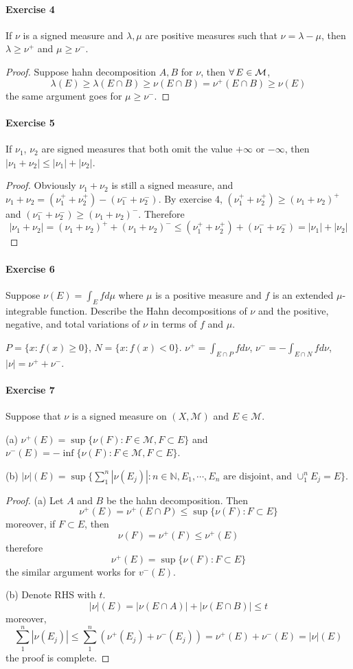 \paragraph*{Exercise 4}
If $\nu$ is a signed measure and $\lambda,\mu$ are positive measures such that $\nu=\lambda-\mu$, then $\lambda\ge\nu^+$ and $\mu\ge\nu^-$.
\begin{proof}
    Suppose hahn decomposition $A,B$ for $\nu$, then $\forall\, E\in\mathcal{M}$,
    $$
    \lambda(E)\ge\lambda(E\cap B)\ge\nu(E\cap B)=\nu^+(E\cap B)\ge\nu(E)
    $$
    the same argument goes for $\mu\ge\nu^-$.
\end{proof}
\paragraph*{Exercise 5}
If $\nu_1$, $\nu_2$ are signed measures that both omit the value $+\infty$ or $-\infty$, then $|\nu_1+\nu_2|\le|\nu_1|+|\nu_2|$.
\begin{proof}
    Obviously $\nu_1+\nu_2$ is still a signed measure, and $\nu_1+\nu_2=(\nu_1^++\nu_2^+)-(\nu_1^-+\nu_2^-)$. By exercise 4, $(\nu_1^++\nu_2^+)\ge(\nu_1+\nu_2)^+$ and $(\nu_1^-+\nu_2^-)\ge(\nu_1+\nu_2)^-$. Therefore
    $$
    |\nu_1+\nu_2|=(\nu_1+\nu_2)^++(\nu_1+\nu_2)^-\le (\nu_1^++\nu_2^+)+(\nu_1^-+\nu_2^-)=|\nu_1|+|\nu_2|
    $$
\end{proof}
\paragraph*{Exercise 6}
Suppose $\nu(E)=\int_E fd\mu$ where $\mu$ is a positive measure and $f$ is an extended $\mu$-integrable function. Describe the Hahn decompositions of $\nu$ and the positive, negative, and total variations of $\nu$ in terms of $f$ and $\mu$.
\begin{solution}
    $P=\{x:f(x)\ge 0\}$, $N=\{x:f(x)<0\}$. $\nu^+=\int_{E\cap P}fd\nu$, $\nu^-=-\int_{E\cap N}fd\nu$, $|\nu|=\nu^++\nu^-$.
\end{solution}
\paragraph*{Exercise 7}
Suppose that $\nu$ is a signed measure on $(X,\mathcal{M})$ and $E\in\mathcal{M}$.
\par (a) $\nu^+(E)=\sup\{\nu(F):F\in\mathcal{M},F\subset E\}$ and $\nu^-(E)=-\inf\{\nu(F):F\in\mathcal{M},F\subset E\}$.
\par (b) $|\nu|(E)=\sup\{\sum^n_1|\nu(E_j)|:n\in\mathbb{N},\text{$E_1,\cdots,E_n$ are disjoint, and $\cup^n_1E_j=E$}\}$.
\begin{proof}
    (a) Let $A$ and $B$ be the hahn decomposition. Then
    $$
    \nu^+(E)=\nu^+(E\cap P)\le\sup\{\nu(F):F\subset E\}
    $$
    moreover, if $F\subset E$, then
    $$
    \nu(F)=\nu^+(F)\le\nu^+(E)
    $$
    therefore
    $$
    \nu^+(E)=\sup\{\nu(F):F\subset E\}
    $$
    the similar argument works for $v^-(E)$.
    \par (b) Denote RHS with $t$.
    $$
    |\nu|(E)=|\nu(E\cap A)|+|\nu(E\cap B)|\le t
    $$
    moreover, 
    $$
    \sum^n_1|\nu(E_j)|\le\sum^n_1(\nu^+(E_j)+\nu^-(E_j))=\nu^+(E)+\nu^-(E)=|\nu|(E)
    $$
    the proof is complete.
\end{proof}
